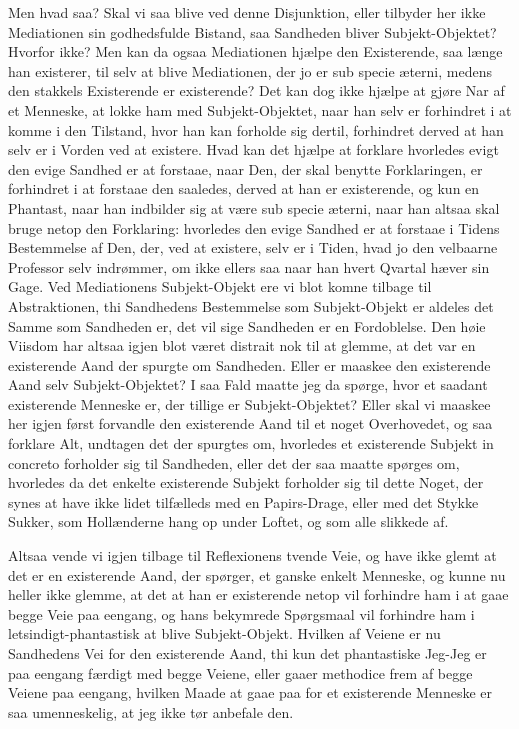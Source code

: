 \documentclass[12pt,a4paper]{article}
\begin{document}
Men hvad saa? Skal vi saa blive ved denne Disjunktion, eller tilbyder her ikke Mediationen sin godhedsfulde Bistand, saa Sandheden bliver Subjekt-Objektet? Hvorfor ikke? Men kan da ogsaa Mediationen hjælpe den Existerende, saa længe han existerer, til selv at blive Mediationen, der jo er sub specie æterni, medens den stakkels Existerende er existerende? Det kan dog ikke hjælpe at gjøre Nar af et Menneske, at lokke ham med Subjekt-Objektet, naar han selv er forhindret i at komme i den Tilstand, hvor han kan forholde sig dertil, forhindret derved at han selv er i Vorden ved at existere. Hvad kan det hjælpe at forklare hvorledes evigt den evige Sandhed er at forstaae, naar Den, der skal benytte Forklaringen, er forhindret i at forstaae den saaledes, derved at han er existerende, og kun en Phantast, naar han indbilder sig at være sub specie æterni, naar han altsaa skal bruge netop den Forklaring: hvorledes den evige Sandhed er at forstaae i Tidens Bestemmelse af Den, der, ved at existere, selv er i Tiden, hvad jo den velbaarne Professor selv indrømmer, om ikke ellers saa naar han hvert Qvartal hæver sin Gage. Ved Mediationens Subjekt-Objekt ere vi blot komne tilbage til Abstraktionen, thi Sandhedens Bestemmelse som Subjekt-Objekt er aldeles det Samme som Sandheden er, det vil sige Sandheden er en Fordoblelse. Den høie Viisdom har altsaa igjen blot været distrait nok til at glemme, at det var en existerende Aand der spurgte om Sandheden. Eller er maaskee den existerende Aand selv Subjekt-Objektet? I saa Fald maatte jeg da spørge, hvor et saadant existerende Menneske er, der tillige er Subjekt-Objektet? Eller skal vi maaskee her igjen først forvandle den existerende Aand til et noget Overhovedet, og saa forklare Alt, undtagen det der spurgtes om, hvorledes et existerende Subjekt in concreto forholder sig til Sandheden, eller det der saa maatte spørges om, hvorledes da det enkelte existerende Subjekt forholder sig til dette Noget, der synes at have ikke lidet tilfælleds med en Papirs-Drage, eller med det Stykke Sukker, som Hollænderne hang op under Loftet, og som alle slikkede af.

Altsaa vende vi igjen tilbage til Reflexionens tvende Veie, og have ikke glemt at det er en existerende Aand, der spørger, et ganske enkelt Menneske, og kunne nu heller ikke glemme, at det at han er existerende netop vil forhindre ham i at gaae begge Veie paa eengang, og hans bekymrede Spørgsmaal vil forhindre ham i letsindigt-phantastisk at blive Subjekt-Objekt. Hvilken af Veiene er nu Sandhedens Vei for den existerende Aand, thi kun det phantastiske Jeg-Jeg er paa eengang færdigt med begge Veiene, eller gaaer methodice frem af begge Veiene paa eengang, hvilken Maade at gaae paa for et existerende Menneske er saa umenneskelig, at jeg ikke tør anbefale den.
\end{document}
